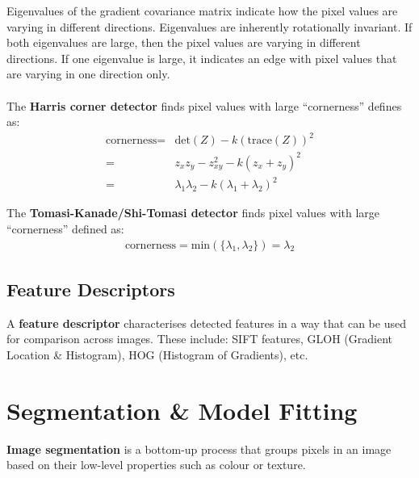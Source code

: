 \documentclass[a4paper,11pt]{article}
\begin{document}
Eigenvalues of the gradient covariance matrix indicate how the pixel values are varying in different directions.
Eigenvalues are inherently rotationally invariant.
If both eigenvalues are large, then the pixel values are varying in different directions.
If one eigenvalue is large, it indicates an edge with pixel values that are varying in one direction only.
\\\\
The \textbf{Harris corner detector} finds pixel values with large ``cornerness'' defines as:
\begin{align*}
    \text{cornerness} =& \text{det}(Z) - k (\text{trace}(Z))^2 \\
    =& z_x z_y - z_{xy}^2 - k (z_x + z_y)^2 \\
    =& \lambda_1 \lambda_2 - k(\lambda_1 + \lambda_2)^2
\end{align*}

The \textbf{Tomasi-Kanade/Shi-Tomasi detector} finds pixel values with large ``cornerness'' defined as:
\begin{align*}
    \text{cornerness} = \text{min}( \{ \lambda_1, \lambda_2 \}) = \lambda_2
\end{align*}

\subsection{Feature Descriptors}
A \textbf{feature descriptor} characterises detected features in a way that can be used for comparison across images.
These include: SIFT features, GLOH (Gradient Location \& Histogram), HOG (Histogram of Gradients), etc.

\section{Segmentation \& Model Fitting}
\textbf{Image segmentation} is a bottom-up process that groups pixels in an image based on their low-level properties such as colour or texture.
\end{document}
